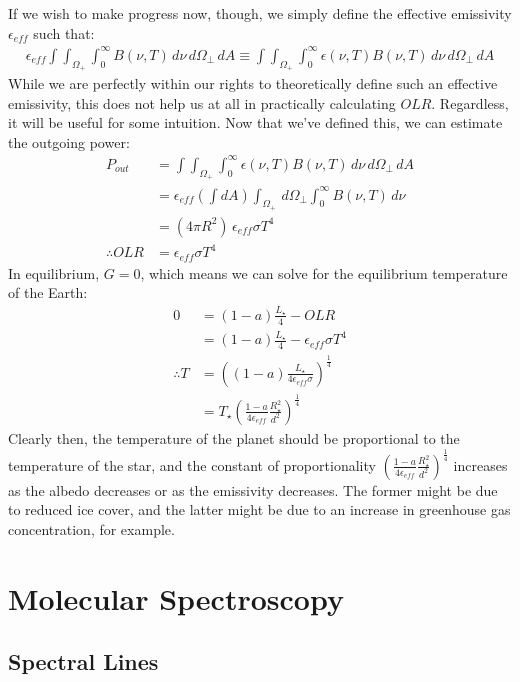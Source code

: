 If we wish to make progress now, though, we simply define the effective emissivity $\epsilon_{eff}$ such that:
\begin{align*}
    \epsilon_{eff}\int\int_{\Omega_+}\int _0^\infty B(\nu,T)\,d\nu\,d\Omega_\perp\,dA\equiv\int\int_{\Omega_+}\int _0^\infty \epsilon(\nu,T) B(\nu,T)\,d\nu\,d\Omega_\perp\,dA
\end{align*}
While we are perfectly within our rights to theoretically define such an effective emissivity, this does not help us at all in practically calculating $OLR$. Regardless, it will be useful for some intuition. Now that we've defined this, we can estimate the outgoing power:
\begin{align*}
    P_{out}&=\int\int_{\Omega_+}\int _0^\infty \epsilon(\nu,T) B(\nu,T)\,d\nu\,d\Omega_\perp\,dA\\
    &=\epsilon_{eff}\left(\int dA\right)\int_{\Omega_+}\,d\Omega_\perp\int _0^\infty B(\nu,T)\,d\nu\\
    &=(4\pi R^2)\,\epsilon_{eff}\sigma T^4\\
    \therefore OLR &= \epsilon_{eff}\sigma T^4
\end{align*}
In equilibrium, $G=0$, which means we can solve for the equilibrium temperature of the Earth:
\begin{align*}
    0&=(1-a) \frac{L_\star}{4} - OLR\\
    &=(1-a) \frac{L_\star}{4} - \epsilon_{eff}\sigma T^4\\
    \therefore T &= \left( 
        (1-a) \frac{L_\star}{4\epsilon_{eff}\sigma}
     \right)^{\frac{1}{4}}\\
    &=T_{\star}\left(
    \frac{1-a}{4\epsilon_{eff}}\frac{R_{\star}^2}{d^2}
    \right)^\frac{1}{4}
\end{align*}
Clearly then, the temperature of the planet should be proportional to the temperature of the star, and the constant of proportionality $\left(\frac{1-a}{4\epsilon_{eff}}\frac{R_{\star}^2}{d^2}\right)^\frac{1}{4}$ increases as the albedo decreases or as the emissivity decreases. The former might be due to reduced ice cover, and the latter might be due to an increase in greenhouse gas concentration, for example.

\chapter{Molecular Spectroscopy}\label{Molecular Spectroscopy}

\section{Spectral Lines}

